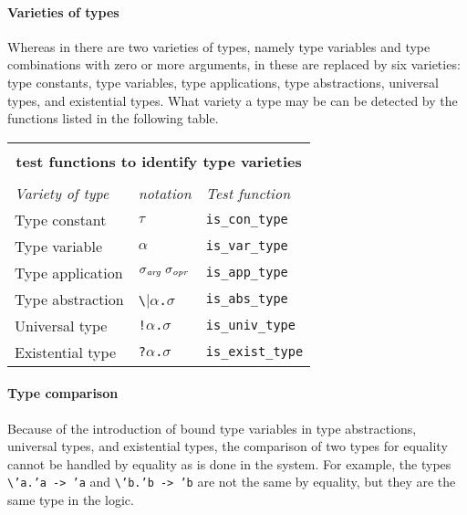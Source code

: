 \paragraph{Varieties of types}

Whereas in \HOL{} there are two varieties of types, namely type variables
and type combinations with zero or more arguments,
in \HOLW{} these are replaced by six varieties: type constants,
type variables, type applications, type abstractions, universal types, and
existential types.  What variety a type may be can be detected by the
\ML{} functions listed in the following table.

\begin{center}
\begin{tabular}{|l|l|l|} \hline
\multicolumn{3}{|c|}{ } \\
\multicolumn{3}{|c|}{\bf \ML{} test functions to identify type varieties} \\
\multicolumn{3}{|c|}{ } \\
{\it Variety of type} &
{\it \HOL{${}_\omega$} notation} &
{\it Test function} \\ \hline
Type constant & $\tau$ & \texttt{is\_con\_type} \\ \hline
Type variable & $\alpha$ & \texttt{is\_var\_type} \\ \hline
Type application &
$\sigma_{\mbox{\scriptsize \it arg}}\ \sigma_{\mbox{\scriptsize \it opr}}$ &
\texttt{is\_app\_type} \\ \hline
Type abstraction & {\small\verb|\|}$\alpha${\small\verb|.|}$\sigma$ &
\texttt{is\_abs\_type} \\ \hline
Universal type & {\small\verb|!|}$\alpha${\small\verb|.|}$\sigma$ &
\texttt{is\_univ\_type} \\ \hline
Existential type & {\small\verb|?|}$\alpha${\small\verb|.|}$\sigma$ &
\texttt{is\_exist\_type} \\ \hline
\end{tabular}
\end{center}\label{type-tests-table}


\paragraph{Type comparison}

Because of the introduction of bound type variables in type abstractions,
universal types, and existential types, the comparison of two types for 
equality cannot be handled
by \ML{} equality as is done in the \HOL{} system.  For example, the types
{\small\verb|\|}\texttt{'a.'a~->~'a} and {\small\verb|\|}\texttt{'b.'b~->~'b}
are not the same by \ML{} equality, but they are the same type in the \HOLW{}
logic.

